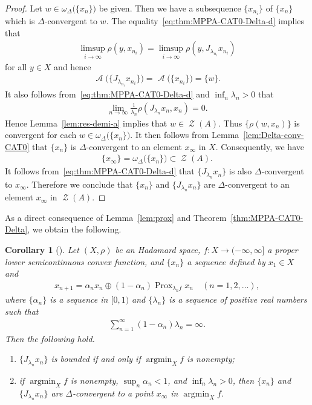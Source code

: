 \documentclass[draft]{amsart}
\numberwithin{equation}{section}
\DeclareMathOperator*{\Argmin}{argmin}
\DeclareMathOperator{\AC}{\mathcal{A}}
\DeclareMathOperator{\Prox}{Prox}
\DeclareMathOperator{\Zer}{\mathcal{Z}}
\theoremstyle{plain}
\newtheorem{corollary}[theorem]{Corollary}
\theoremstyle{definition}
\theoremstyle{remark}
\begin{document}
\begin{proof}
 Let $w\in \omega_{\Delta}\bigl(\{x_n\}\bigr)$ be given. 
 Then we have a subsequence $\{x_{n_i}\}$ of $\{x_n\}$ which 
 is $\Delta$-convergent to $w$. 
 The equality~\eqref{eq:thm:MPPA-CAT0-Delta-d} implies that 
 \begin{align*}
  \limsup_{i\to \infty} \rho(y, x_{n_i}) = \limsup_{i\to \infty} \rho(y, J_{\lambda_{n_i}}x_{n_i})
 \end{align*}
 for all $y\in X$ and hence 
 \begin{align*}
   \AC\bigl(\{J_{\lambda_{n_i}}x_{n_i}\}\bigr) 
  = \AC\bigl(\{x_{n_i}\}\bigr) = \{w\}. 
 \end{align*}
 It also follows from~\eqref{eq:thm:MPPA-CAT0-Delta-d} and $\inf_n \lambda_n >0$ that 
 \begin{align*}
  \lim_{n\to \infty}\frac{1}{\lambda_n}\rho(J_{\lambda_n}x_n, x_n) =0. 
 \end{align*}
 Hence Lemma~\ref{lem:res-demi-a} implies that 
 $w\in \Zer (A)$. Thus $\{\rho(w, x_n)\}$ is convergent for each $w\in \omega_{\Delta}\bigl(\{x_n\}\bigr)$. 
 It then follows from Lemma~\ref{lem:Delta-conv-CAT0} that 
 $\{x_n\}$ is $\Delta$-convergent to an element $x_{\infty}$ in $X$. 
 Consequently, we have 
 \begin{align*}
  \{x_{\infty}\} = \omega_{\Delta}\bigl(\{x_n\}\bigr) \subset \Zer (A). 
 \end{align*}
 It follows from~\eqref{eq:thm:MPPA-CAT0-Delta-d} that 
 $\{J_{\lambda_n}x_n\}$ is also $\Delta$-convergent to $x_{\infty}$. 
 Therefore we conclude that $\{x_n\}$ and $\{J_{\lambda_n}x_n\}$ are 
 $\Delta$-convergent to an element $x_{\infty}$ in $\Zer (A)$. 
\end{proof}

As a direct consequence of Lemma~\ref{lem:prox} 
and Theorem~\ref{thm:MPPA-CAT0-Delta}, we obtain the following. 

\begin{corollary}[\cite{MR3574140}]
  Let $(X, \rho)$ be an Hadamard space, 
 $f\colon X\to (-\infty, \infty]$ a proper lower semicontinuous convex function, 
 and $\{x_n\}$ a sequence defined by $x_1\in X$ and 
 \begin{align}
  x_{n+1} = \alpha_{n} x_n \oplus (1-\alpha_n) \Prox_{\lambda_n f}x_n 
  \quad (n=1,2,\dots),    
 \end{align}
 where $\{\alpha_n\}$ is a sequence in $[0,1)$ 
 and $\{\lambda_n\}$ is a sequence of positive real numbers such that 
 \begin{align*}
  \sum_{n=1}^{\infty}(1-\alpha_n)\lambda_n=\infty. 
 \end{align*}
 Then the following hold. 
 \begin{enumerate}
  \item[(i)] $\{J_{\lambda_n}x_n\}$ is bounded 
 if and only if $\Argmin_X f$ is nonempty; 
  \item[(ii)] if $\Argmin_X f$ is nonempty, $\sup_{n}\alpha_n <1$, and 
 $\inf_{n} \lambda_n >0$, then 
 $\{x_n\}$ and $\{J_{\lambda_n}x_n\}$ are $\Delta$-convergent to a point $x_{\infty}$ in $\Argmin_X f$. 
 \end{enumerate}
\end{corollary}
\end{document}

